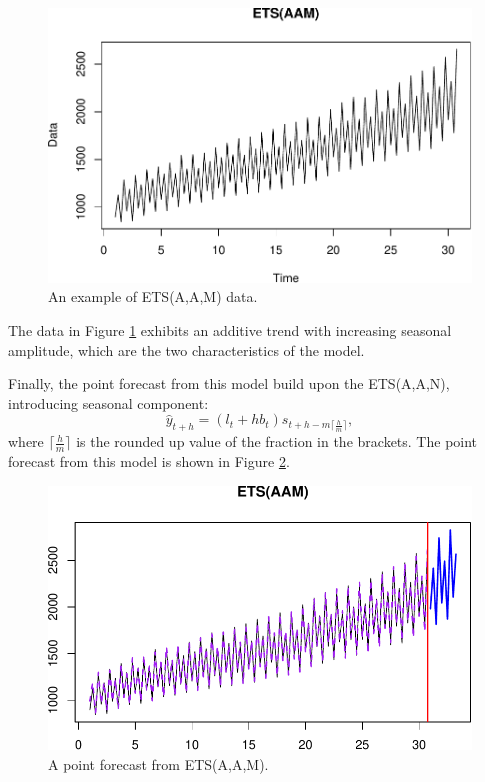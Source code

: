 \documentclass[]{book}
\theoremstyle{definition}
\theoremstyle{definition}
\theoremstyle{definition}
\theoremstyle{definition}
\theoremstyle{remark}
\begin{document}
\begin{figure}
\centering
\includegraphics{Svetunkov--2022----ADAM_files/figure-latex/ETSAAMExample-1.pdf}
\caption{\label{fig:ETSAAMExample}An example of ETS(A,A,M) data.}
\end{figure}

The data in Figure \ref{fig:ETSAAMExample} exhibits an additive trend with increasing seasonal amplitude, which are the two characteristics of the model.

Finally, the point forecast from this model build upon the ETS(A,A,N), introducing seasonal component:
\begin{equation}
    \hat{y}_{t+h} = (l_{t} + h b_t) s_{t+h-m\lceil\frac{h}{m}\rceil},
  \label{eq:ETSAAAForecast}
\end{equation}
where \(\lceil\frac{h}{m}\rceil\) is the rounded up value of the fraction in the brackets. The point forecast from this model is shown in Figure \ref{fig:ETSAAMExampleForecast}.

\begin{figure}
\centering
\includegraphics{Svetunkov--2022----ADAM_files/figure-latex/ETSAAMExampleForecast-1.pdf}
\caption{\label{fig:ETSAAMExampleForecast}A point forecast from ETS(A,A,M).}
\end{figure}
\end{document}
